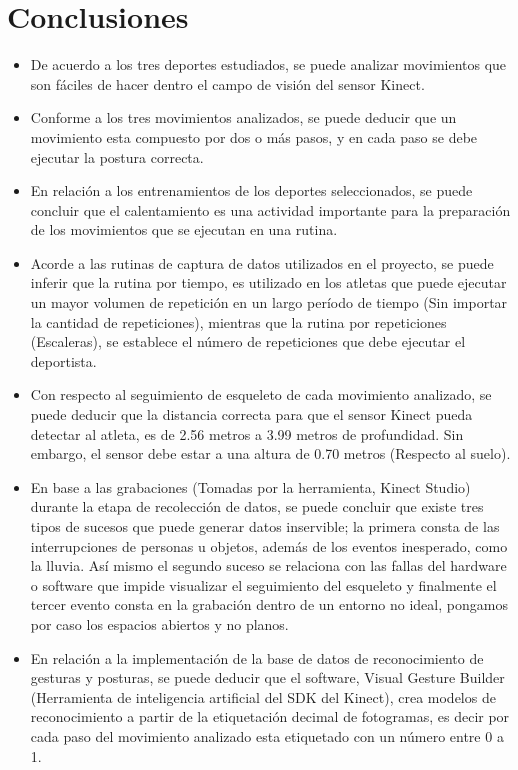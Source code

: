 \section{Conclusiones} \label{ded:con}
\begin{itemize}
\item De acuerdo a los tres deportes estudiados, se puede analizar movimientos que son f\'aciles de hacer dentro el campo de visi\'on del sensor Kinect.
\item Conforme a los tres movimientos analizados, se puede deducir que un movimiento esta compuesto por dos o m\'as pasos, y en cada paso se debe ejecutar  la postura correcta.
\item En relaci\'on a los entrenamientos de los deportes seleccionados, se puede concluir que el calentamiento es una actividad importante para la preparaci\'on de los movimientos que se ejecutan en una rutina.
\item Acorde a las rutinas de captura de datos utilizados en el proyecto,  se puede inferir que la rutina por tiempo, es utilizado en los atletas que puede ejecutar un mayor volumen de repetici\'on en un largo per\'iodo de tiempo (Sin importar la cantidad de repeticiones), mientras que la rutina por repeticiones (Escaleras), se establece el n\'umero de repeticiones que debe ejecutar el deportista.
\item  Con respecto al seguimiento de esqueleto de cada movimiento analizado, se puede deducir que la distancia correcta para que el sensor Kinect pueda detectar al atleta, es de  2.56 metros a 3.99 metros de profundidad. Sin embargo, el sensor debe estar a una altura de 0.70 metros (Respecto al suelo).
\item  En base a las grabaciones (Tomadas por la herramienta, Kinect Studio) durante la etapa de recolecci\'on de datos, se puede concluir que existe tres tipos de sucesos que puede generar datos inservible; la primera consta de las interrupciones de personas u objetos, adem\'as de los eventos inesperado, como la lluvia. As\'i mismo el segundo suceso se relaciona con las fallas del hardware o software que impide visualizar el seguimiento del esqueleto y finalmente el tercer evento consta en la grabaci\'on dentro de un entorno no ideal, pongamos por caso los espacios abiertos y no planos.
\item En relaci\'on a la implementaci\'on de la base de datos de reconocimiento de gesturas y posturas, se puede deducir que el software, Visual Gesture Builder (Herramienta de inteligencia artificial del SDK del Kinect), crea modelos de reconocimiento a partir de la etiquetaci\'on decimal de fotogramas, es decir por cada paso del movimiento analizado esta etiquetado con un n\'umero entre 0 a 1.

\end{itemize}
